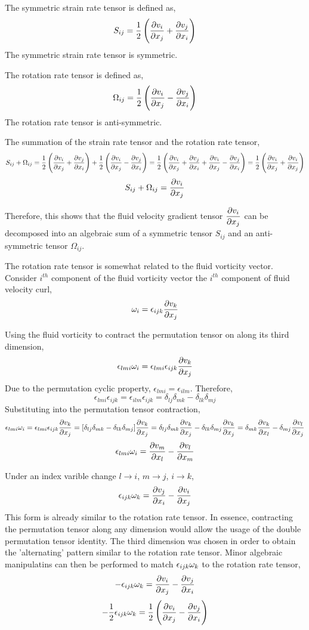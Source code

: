 \documentclass[class=report, 12pt, crop=false]{standalone}
\begin{document}
\begin{center}

The symmetric strain rate tensor is defined as, 
$$S_{ij} = \frac{1}{2}\left(\frac{\partial v_i}{\partial x_j}+\frac{\partial v_j}{\partial x_i}\right)$$ 
The symmetric strain rate tensor is symmetric.

The rotation rate tensor is defined as,
$$\Omega_{ij} = \frac{1}{2}\left(\frac{\partial v_i}{\partial x_j}-\frac{\partial v_j}{\partial x_i}\right)$$
The rotation rate tensor is anti-symmetric.

The summation of the strain rate tensor and the rotation rate tensor,
$$S_{ij} + \Omega_{ij} = \frac{1}{2}\left(\frac{\partial v_i}{\partial x_j}+\frac{\partial v_j}{\partial x_i}\right) + \frac{1}{2}\left(\frac{\partial v_i}{\partial x_j}-\frac{\partial v_j}{\partial x_i}\right) = \frac{1}{2}\left(\frac{\partial v_i}{\partial x_j}+\frac{\partial v_j}{\partial x_i} + \frac{\partial v_i}{\partial x_j}-\frac{\partial v_j}{\partial x_i}\right) = \frac{1}{2}\left(\frac{\partial v_i}{\partial x_j} + \frac{\partial v_i}{\partial x_j}\right)$$
$$S_{ij} + \Omega_{ij} = \frac{\partial v_i}{\partial x_j}$$

Therefore, this shows that the fluid velocity gradient tensor $\displaystyle \frac{\partial v_i}{\partial x_j}$ can be decomposed into an algebraic sum of a symmetric tensor $S_{ij}$ and an anti-symmetric tensor $\Omega_{ij}$.



The rotation rate tensor is somewhat related to the fluid vorticity vector. Consider $i^{th}$ component of the fluid vorticity vector the $i^{th}$ component of fluid velocity curl,
$$\omega_i = \epsilon_{ijk}\frac{\partial v_k}{\partial x_j}$$


Using the fluid vorticity to contract the permutation tensor on along its third dimension,
$$\epsilon_{lmi}\omega_i = \epsilon_{lmi}\epsilon_{ijk}\frac{\partial v_k}{\partial x_j}$$
Due to the permutation cyclic property, $\epsilon_{lmi} = \epsilon_{ilm}$. Therefore,
$$\epsilon_{lmi}\epsilon_{ijk} = \epsilon_{ilm}\epsilon_{ijk} = \delta_{lj}\delta_{mk} - \delta_{lk}\delta_{mj}$$
Substituting into the permutation tensor contraction,
$$\epsilon_{lmi}\omega_i = \epsilon_{lmi}\epsilon_{ijk}\frac{\partial v_k}{\partial x_j} = [\delta_{lj}\delta_{mk} - \delta_{lk}\delta_{mj}]\frac{\partial v_k}{\partial x_j} = \delta_{lj}\delta_{mk}\frac{\partial v_k}{\partial x_j} - \delta_{lk}\delta_{mj}\frac{\partial v_k}{\partial x_j} = \delta_{mk}\frac{\partial v_k}{\partial x_l} - \delta_{mj}\frac{\partial v_l}{\partial x_j}$$
$$\epsilon_{lmi}\omega_i = \frac{\partial v_m}{\partial x_l} - \frac{\partial v_l}{\partial x_m}$$

Under an index varible change $l\to i$, $m\to j$, $i\to k$,
$$\epsilon_{ijk}\omega_k = \frac{\partial v_j}{\partial x_i} - \frac{\partial v_i}{\partial x_j}$$
This form is already similar to the rotation rate tensor. In essence, contracting the permutation tensor along any dimension would allow the usage of the double permutation tensor identity. The third dimension was chosen in order to obtain the 'alternating' pattern similar to the rotation rate tensor. Minor algebraic manipulatins can then be performed to match $\epsilon_{ijk}\omega_k$ to the rotation rate tensor,
$$-\epsilon_{ijk}\omega_k =  \frac{\partial v_i}{\partial x_j} - \frac{\partial v_j}{\partial x_i}$$
$$-\frac{1}{2}\epsilon_{ijk}\omega_k =  \frac{1}{2}\left(\frac{\partial v_i}{\partial x_j} - \frac{\partial v_j}{\partial x_i}\right)$$


\end{center}
\end{document}
